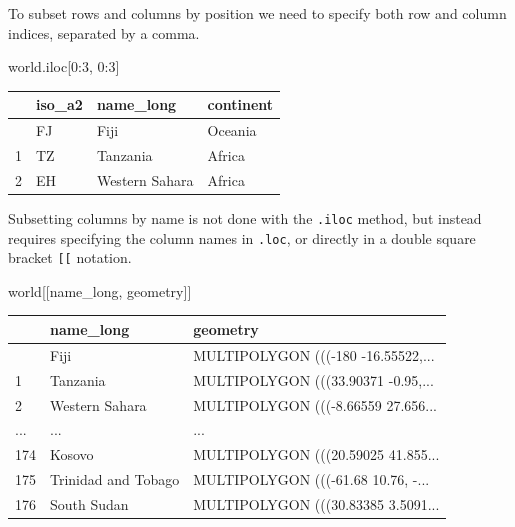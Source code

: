 \documentclass[
  letterpaper,
]{krantz}
\newenvironment{Shaded}{\begin{snugshade}}{\end{snugshade}}
\newcommand{\DecValTok}[1]{\textcolor[rgb]{0.68,0.00,0.00}{#1}}
\newcommand{\NormalTok}[1]{\textcolor[rgb]{0.00,0.23,0.31}{#1}}
\newcommand{\StringTok}[1]{\textcolor[rgb]{0.13,0.47,0.30}{#1}}
\begin{document}
To subset rows and columns by position we need to specify both row and
column indices, separated by a comma.

\begin{Shaded}
\begin{Highlighting}[]
\NormalTok{world.iloc[}\DecValTok{0}\NormalTok{:}\DecValTok{3}\NormalTok{, }\DecValTok{0}\NormalTok{:}\DecValTok{3}\NormalTok{]}
\end{Highlighting}
\end{Shaded}

\begin{longtable}[]{@{}llll@{}}
\toprule\noalign{}
& iso\_a2 & name\_long & continent \\
\midrule\noalign{}
\endhead
\bottomrule\noalign{}
\endlastfoot
0 & FJ & Fiji & Oceania \\
1 & TZ & Tanzania & Africa \\
2 & EH & Western Sahara & Africa \\
\end{longtable}

Subsetting columns by name is not done with the \texttt{.iloc} method,
but instead requires specifying the column names in \texttt{.loc}, or
directly in a double square bracket \texttt{{[}{[}} notation.

\begin{Shaded}
\begin{Highlighting}[]
\NormalTok{world[[}\StringTok{\textquotesingle{}name\_long\textquotesingle{}}\NormalTok{, }\StringTok{\textquotesingle{}geometry\textquotesingle{}}\NormalTok{]]}
\end{Highlighting}
\end{Shaded}

\begin{longtable}[]{@{}lll@{}}
\toprule\noalign{}
& name\_long & geometry \\
\midrule\noalign{}
\endhead
\bottomrule\noalign{}
\endlastfoot
0 & Fiji & MULTIPOLYGON (((-180 -16.55522,... \\
1 & Tanzania & MULTIPOLYGON (((33.90371 -0.95,... \\
2 & Western Sahara & MULTIPOLYGON (((-8.66559 27.656... \\
... & ... & ... \\
174 & Kosovo & MULTIPOLYGON (((20.59025 41.855... \\
175 & Trinidad and Tobago & MULTIPOLYGON (((-61.68 10.76, -... \\
176 & South Sudan & MULTIPOLYGON (((30.83385 3.5091... \\
\end{longtable}
\end{document}
